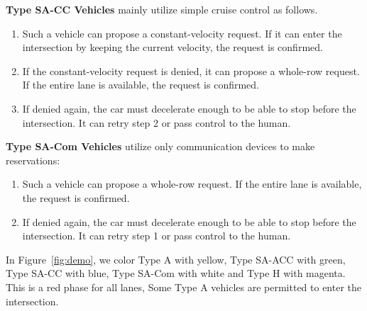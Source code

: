 \noindent
\textbf{Type SA-CC Vehicles} mainly utilize simple cruise control as follows.
\begin{enumerate}

\item Such a vehicle can propose a constant-velocity request. If it
can enter the intersection by keeping the current velocity, the
request is confirmed.

\item If the constant-velocity request is denied, it can propose a whole-row
  request. If the entire lane is available, the request is confirmed.

\item If denied again, the car must decelerate enough to be able to
stop before the intersection.  It can retry step 2 or pass control to
the human.

\end{enumerate}

\noindent
\textbf{Type SA-Com Vehicles} utilize only communication devices
to make reservations:
\begin{enumerate}

\item Such a vehicle can propose a whole-row request.  If the entire
lane is available, the request is confirmed.

\item If denied again, the car must decelerate enough to be able to
stop before the intersection.  It can retry step 1 or pass control to
the human.

\end{enumerate}

In Figure~\ref{fig:demo}, we color Type A with yellow, Type SA-ACC
with green, Type SA-CC with blue, Type SA-Com with white and Type H
with magenta. This is a red phase for all lanes, Some Type A vehicles
are permitted to enter the intersection.









